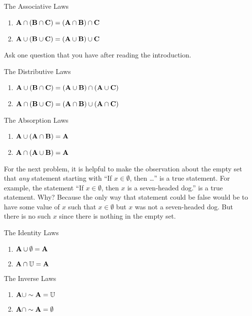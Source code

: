 \begin{prb}
The Associative Laws
\begin{enumerate}
\item  $\mathbf A \cap (\mathbf B \cap \mathbf C) = (\mathbf A \cap \mathbf B) \cap \mathbf C$
\item  $\mathbf A \cup (\mathbf B \cup \mathbf C) = (\mathbf A \cup \mathbf B) \cup \mathbf C$
\end{enumerate}
\end{prb}

\begin{prb}
Ask one question that you have after reading the introduction.
\end{prb}

\begin{prb}

The Distributive Laws
\begin{enumerate}
\item  $\mathbf A \cup (\mathbf B \cap \mathbf C) = (\mathbf A \cup \mathbf B) \cap (\mathbf A \cup \mathbf C)$
\item  $\mathbf A \cap (\mathbf B \cup \mathbf C) = (\mathbf A \cap \mathbf B) \cup (\mathbf A \cap \mathbf C)$
\end{enumerate}
\end{prb}

\begin{prb}
The Absorption Laws
\begin{enumerate}
\item $\mathbf A \cup (\mathbf A \cap \mathbf B) = \mathbf A$
\item $\mathbf A \cap (\mathbf A \cup \mathbf B) = \mathbf A$
\end{enumerate}
\end{prb}

For the next problem, it is helpful to make the observation about the empty set that  \emph{any} statement starting with ``If $x \in \emptyset$, then \dots'' is a true statement. For example, the statement ``If $x \in \emptyset$, then $x$ is a seven-headed dog.'' is a true statement.  Why? Because the only way that statement could be false would be to have some value of $x$ such that $x \in \emptyset$ but $x$ was not a seven-headed dog. But there is no such $x$ since there is nothing in the empty set.

\begin{prb}
The Identity Laws
\begin{enumerate}
\item  $\mathbf A \cup \emptyset = \mathbf A$
\item  $\mathbf A \cap \mathbb U = \mathbf A$
\end{enumerate}
\end{prb}

\begin{prb}
The Inverse Laws
\begin{enumerate}
\item $\mathbf A \cup \sim \mathbf A = \mathbb U$
\item $\mathbf A \cap \sim \mathbf A = \emptyset$
\end{enumerate}
\end{prb}

